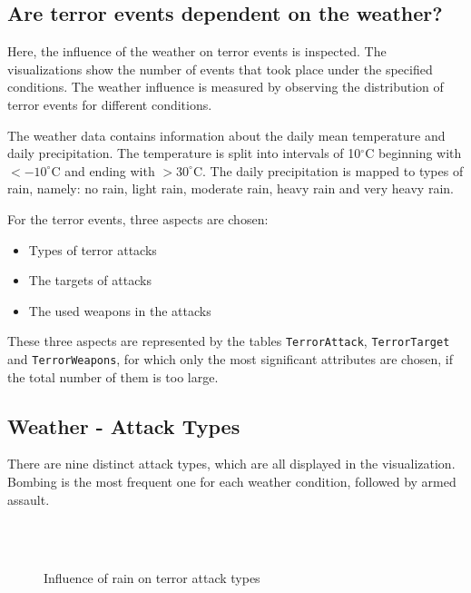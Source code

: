 \subsection{Are terror events dependent on the weather?}
Here, the influence of the weather on terror events is inspected. The visualizations show the number of events that took place under the specified conditions. The weather influence is measured by observing the distribution of terror events for different conditions.

The weather data contains information about the daily mean temperature and daily precipitation. The temperature is split into intervals of 10$^\circ$C beginning with $< -10^\circ$C and ending with $> 30^\circ$C. The daily precipitation is mapped to types of rain, namely: no rain, light rain, moderate rain, heavy rain and very heavy rain.

For the terror events, three aspects are chosen:
\begin{itemize}
	\item Types of terror attacks
	\item The targets of attacks
	\item The used weapons in the attacks
\end{itemize}

These three aspects are represented by the tables \texttt{TerrorAttack}, \texttt{TerrorTarget} and \texttt{TerrorWeapons}, for which only the most significant attributes are chosen, if the total number of them is too large.

\subsection{Weather - Attack Types}
There are nine distinct attack types, which are all displayed in the visualization. Bombing is the most frequent one for each weather condition, followed by armed assault.

\begin{figure}[!ht]
\centering
    \qquad\\
    \qquad
    \qquad\\
    \qquad
\caption{Influence of rain on terror attack types}
\end{figure}

